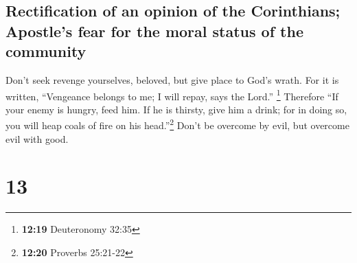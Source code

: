 \hypertarget{rectification-of-an-opinion-of-the-corinthians-apostles-fear-for-the-moral-status-of-the-community}{%
\subsection{Rectification of an opinion of the Corinthians; Apostle's
fear for the moral status of the
community}\label{rectification-of-an-opinion-of-the-corinthians-apostles-fear-for-the-moral-status-of-the-community}}

 Don't seek revenge yourselves, beloved, but give place
to God's wrath. For it is written, ``Vengeance belongs to me; I will
repay, says the Lord.'' \footnote{\textbf{12:19} Deuteronomy 32:35}
 Therefore ``If your enemy is hungry, feed him. If he is
thirsty, give him a drink; for in doing so, you will heap coals of fire
on his head.''\footnote{\textbf{12:20} Proverbs 25:21-22}
 Don't be overcome by evil, but overcome evil with good.

\hypertarget{section-12}{%
\section{13}\label{section-12}}


